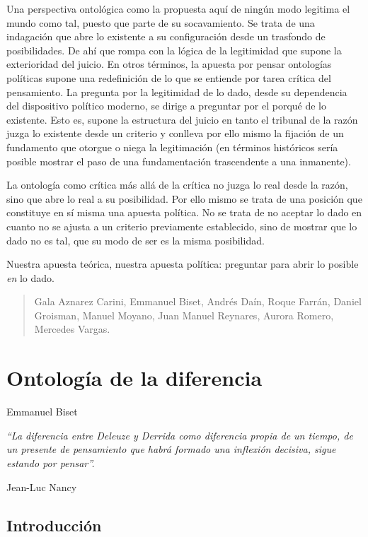 Una perspectiva ontológica como la propuesta aquí de ningún modo legitima el mundo como tal, puesto que parte de su socavamiento. Se trata de una indagación que abre lo existente a su configuración desde un trasfondo de posibilidades. De ahí que rompa con la lógica de la legitimidad que supone la exterioridad del juicio. En otros términos, la apuesta por pensar ontologías políticas supone una redefinición de lo que se entiende por tarea crítica del pensamiento. La pregunta por la legitimidad de lo dado, desde su dependencia del dispositivo político moderno, se dirige a preguntar por el porqué de lo existente. Esto es, supone la estructura del juicio en tanto el tribunal de la razón juzga lo existente desde un criterio y conlleva por ello mismo la fijación de un fundamento que otorgue o niega la legitimación (en términos históricos sería posible mostrar el paso de una fundamentación trascendente a una inmanente).

La ontología como crítica más allá de la crítica no juzga lo real desde la razón, sino que abre lo real a su posibilidad. Por ello mismo se trata de una posición que constituye en sí misma una apuesta política. No se trata de no aceptar lo dado en cuanto no se ajusta a un criterio previamente establecido, sino de mostrar que lo dado no es tal, que su modo de ser es la misma posibilidad.

Nuestra apuesta teórica, nuestra apuesta política: preguntar para abrir lo posible \emph{en} lo dado.

\begin{quote}
Gala Aznarez Carini, Emmanuel Biset, Andrés Daín, Roque Farrán, Daniel Groisman, Manuel Moyano, Juan Manuel Reynares, Aurora Romero, Mercedes Vargas.
\end{quote}

\mainmatter
\chapter{Ontología de la diferencia}

Emmanuel Biset

\epigraph{\emph{\enquote{La diferencia entre Deleuze y Derrida como diferencia propia  de un tiempo, de un presente de pensamiento que habrá formado una inflexión decisiva, sigue estando por pensar}.}}{Jean-Luc Nancy}

\section{Introducción}


